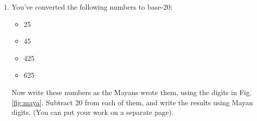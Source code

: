 \documentclass[10pt]{article}
\begin{document}
\begin{enumerate}
\item You've converted the following numbers to base-20:
\begin{itemize}
\item 25
\item 45
\item 425
\item 625
\end{itemize}
Now write these numbers as the Mayans wrote them, using the digits in Fig. \ref{fig:maya}.  Subtract 20 from each of them, and write the results using Mayan digits.  (You can put your work on a separate page).
\end{enumerate}
\end{document}
